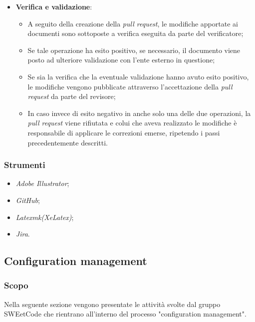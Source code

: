 \documentclass[10pt, a4paper]{article}
\begin{document}
\begin{itemize}
    \item \textbf{Verifica e validazione}: 
    \begin{itemize}
        \item A seguito della creazione della \textit{pull request}, le modifiche apportate ai documenti sono sottoposte a
        verifica eseguita da parte del verificatore;
        \item Se tale operazione ha esito positivo, se necessario, il documento viene posto ad ulteriore validazione con l'ente esterno in questione;
        \item Se sia la verifica che la eventuale validazione hanno avuto esito positivo, le modifiche vengono pubblicate attraverso l'accettazione della 
        \textit{pull request} da parte del revisore;
        \item In caso invece di esito negativo in anche solo una delle due operazioni, la \textit{pull request} viene rifiutata e colui che aveva realizzato le modifiche è responsabile di applicare le correzioni emerse, ripetendo i passi precedentemente descritti.
    \end{itemize} 
    
\end{itemize}

\subsubsection{Strumenti}
\begin{itemize}
    \item \textit{Adobe Illustrator};
    \item \textit{GitHub};
    \item \textit{Latexmk(XeLatex)};
    \item \textit{Jira}.
\end{itemize}

\subsection{Configuration management}
\label{sec:configuration_control}
\subsubsection{Scopo}
Nella seguente sezione vengono presentate le attività svolte dal gruppo SWEetCode che rientrano all'interno del processo "configuration management".
\end{document}
